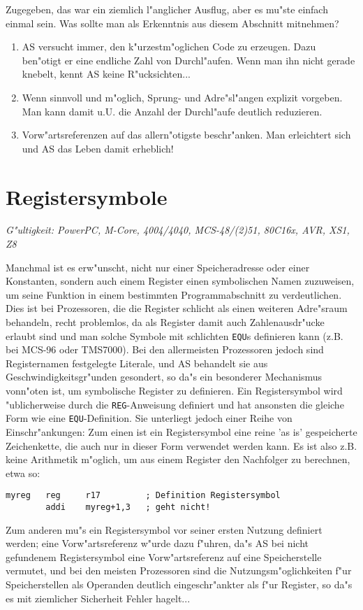 \documentclass[12pt,a4paper,twoside]{report}
\makeatletter
\newcommand{\tty}[1]{{\tt #1}}
\newcommand{\ttindex}[1]{\index{#1@{\tt #1}}}
\makeatother
\begin{document}
Zugegeben, das war ein ziemlich l"anglicher Ausflug, aber es mu"ste einfach
einmal sein.  Was sollte man als Erkenntnis aus diesem Abschnitt mitnehmen?
\begin{enumerate}
\item{AS versucht immer, den k"urzestm"oglichen Code zu erzeugen.  Dazu
      ben"otigt er eine endliche Zahl von Durchl"aufen.  Wenn man ihn 
      nicht gerade knebelt, kennt AS keine R"ucksichten...}
\item{Wenn sinnvoll und m"oglich, Sprung- und Adre"sl"angen explizit
      vorgeben.  Man kann damit u.U. die Anzahl der Durchl"aufe deutlich
      reduzieren.}
\item{Vorw"artsreferenzen auf das allern"otigste beschr"anken.  Man
      erleichtert sich und AS das Leben damit erheblich!}
\end{enumerate}


\section{Registersymbole}
\label{SectRegSyms} \ttindex{Registersymbole}

{\em G"ultigkeit: PowerPC, M-Core, 4004/4040, MCS-48/(2)51, 80C16x, AVR, XS1, Z8}

Manchmal ist es erw"unscht, nicht nur einer Speicheradresse oder einer
Konstanten, sondern auch einem Register einen symbolischen Namen zuzuweisen,
um seine Funktion in einem bestimmten Programmabschnitt zu verdeutlichen.
Dies ist bei Prozessoren, die die Register schlicht als einen weiteren
Adre"sraum behandeln, recht problemlos, da als Register damit auch
Zahlenausdr"ucke erlaubt sind und man solche Symbole mit schlichten
\tty{EQU}s definieren kann (z.B. bei MCS-96 oder TMS7000).  Bei den
allermeisten Prozessoren jedoch sind Registernamen festgelegte Literale, und
AS behandelt sie aus Geschwindigkeitsgr"unden gesondert, so da"s ein besonderer
Mechanismus vonn"oten ist, um symbolische Register zu definieren.  Ein Registersymbol
wird "ublicherweise durch die \tty{REG}-Anweisung definiert und hat ansonsten
die gleiche Form wie eine \tty{EQU}-Definition.  Sie unterliegt jedoch einer
Reihe von Einschr"ankungen:  Zum einen ist ein Registersymbol eine reine 'as is'
gespeicherte Zeichenkette, die auch nur in dieser Form verwendet werden kann.
Es ist also z.B. keine Arithmetik m"oglich, um aus einem Register den Nachfolger
zu berechnen, etwa so:
\begin{verbatim}
myreg   reg     r17         ; Definition Registersymbol
        addi    myreg+1,3   ; geht nicht!
\end{verbatim}
Zum anderen mu"s ein Registersymbol vor seiner ersten Nutzung definiert
werden; eine Vorw"artsreferenz w"urde dazu f"uhren, da"s AS bei nicht gefundenem
Registersymbol eine Vorw"artsreferenz auf eine Speicherstelle vermutet, und bei
den meisten Prozessoren sind die Nutzungsm"oglichkeiten f"ur Speicherstellen als
Operanden deutlich eingeschr"ankter als f"ur Register, so da"s es mit ziemlicher
Sicherheit Fehler hagelt...
\end{document}
